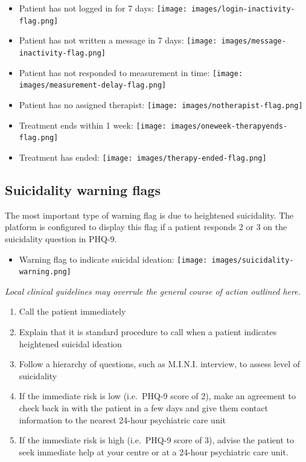 \documentclass[]{book}
\providecommand{\tightlist}{%
  \setlength{\itemsep}{0pt}\setlength{\parskip}{0pt}}
\theoremstyle{definition}
\theoremstyle{definition}
\theoremstyle{definition}
\theoremstyle{remark}
\begin{document}
\begin{itemize}
\tightlist
\item
  Patient has not logged in for 7 days:
  \texttt{[image: images/login-inactivity-flag.png]}
\item
  Patient has not written a message in 7 days:
  \texttt{[image: images/message-inactivity-flag.png]}
\item
  Patient has not responded to measurement in time:
  \texttt{[image: images/measurement-delay-flag.png]}
\item
  Patient has no assigned therapist:
  \texttt{[image: images/notherapist-flag.png]}
\item
  Treatment ends within 1 week:
  \texttt{[image: images/oneweek-therapyends-flag.png]}
\item
  Treatment has ended: \texttt{[image: images/therapy-ended-flag.png]}
\end{itemize}

\hypertarget{suicidality-warning-flags}{%
\subsection{Suicidality warning flags}\label{suicidality-warning-flags}}

The most important type of warning flag is due to heightened
suicidality. The platform is configured to display this flag if a
patient responds 2 or 3 on the suicidality question in PHQ-9.

\begin{itemize}
\tightlist
\item
  Warning flag to indicate suicidal ideation:
  \texttt{[image: images/suicidality-warning.png]}
\end{itemize}

\emph{Local clinical guidelines may overrule the general course of
action outlined here.}

\begin{enumerate}
\def\labelenumi{\arabic{enumi}.}
\tightlist
\item
  Call the patient immediately
\item
  Explain that it is standard procedure to call when a patient indicates
  heightened suicidal ideation
\item
  Follow a hierarchy of questions, such as M.I.N.I. interview, to assess
  level of suicidality
\item
  If the immediate risk is low (i.e.~PHQ-9 score of 2), make an
  agreement to check back in with the patient in a few days and give
  them contact information to the nearest 24-hour psychiatric care unit
\item
  If the immediate risk is high (i.e.~PHQ-9 score of 3), advise the
  patient to seek immediate help at your centre or at a 24-hour
  psychiatric care unit.
\end{enumerate}
\end{document}
